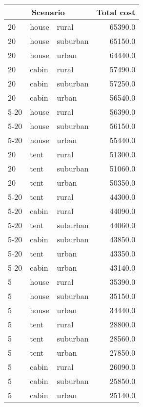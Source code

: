 
\begin{center}
\begin{tabular}{lllr}
\multicolumn{3}{c}{Scenario} & Total cost \\ \hline
20 & house & rural & 65390.0 \\
20 & house & suburban & 65150.0 \\
20 & house & urban & 64440.0 \\
20 & cabin & rural & 57490.0 \\
20 & cabin & suburban & 57250.0 \\
20 & cabin & urban & 56540.0 \\
5-20 & house & rural & 56390.0 \\
5-20 & house & suburban & 56150.0 \\
5-20 & house & urban & 55440.0 \\
20 & tent & rural & 51300.0 \\
20 & tent & suburban & 51060.0 \\
20 & tent & urban & 50350.0 \\
5-20 & tent & rural & 44300.0 \\
5-20 & cabin & rural & 44090.0 \\
5-20 & tent & suburban & 44060.0 \\
5-20 & cabin & suburban & 43850.0 \\
5-20 & tent & urban & 43350.0 \\
5-20 & cabin & urban & 43140.0 \\
5 & house & rural & 35390.0 \\
5 & house & suburban & 35150.0 \\
5 & house & urban & 34440.0 \\
5 & tent & rural & 28800.0 \\
5 & tent & suburban & 28560.0 \\
5 & tent & urban & 27850.0 \\
5 & cabin & rural & 26090.0 \\
5 & cabin & suburban & 25850.0 \\
5 & cabin & urban & 25140.0 \\
\end{tabular}
\end{center}
